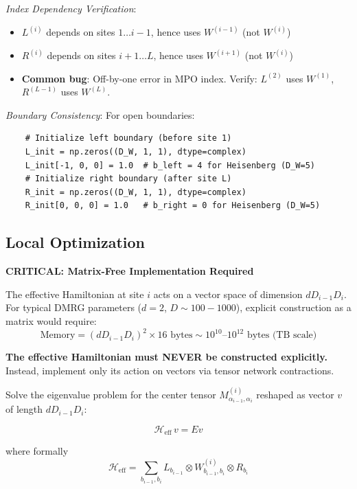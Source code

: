 \documentclass[aps,prb,onecolumn,scriptaddress]{revtex4-2}
\begin{document}
	\textit{Index Dependency Verification}:
	\begin{itemize}
		\item $L^{(i)}$ depends on sites $1 \dots i-1$, hence uses $W^{(i-1)}$ (not $W^{(i)}$)
		\item $R^{(i)}$ depends on sites $i+1 \dots L$, hence uses $W^{(i+1)}$ (not $W^{(i)}$)  
		\item \textbf{Common bug}: Off-by-one error in MPO index. Verify: $L^{(2)}$ uses $W^{(1)}$, $R^{(L-1)}$ uses $W^{(L)}$.
	\end{itemize}
	
	\textit{Boundary Consistency}: For open boundaries:
	\begin{verbatim}
	# Initialize left boundary (before site 1)
	L_init = np.zeros((D_W, 1, 1), dtype=complex)
	L_init[-1, 0, 0] = 1.0  # b_left = 4 for Heisenberg (D_W=5)
	# Initialize right boundary (after site L)
	R_init = np.zeros((D_W, 1, 1), dtype=complex)
	R_init[0, 0, 0] = 1.0   # b_right = 0 for Heisenberg (D_W=5)
	\end{verbatim}
	
	\subsection{Local Optimization}
	
	\textbf{CRITICAL: Matrix-Free Implementation Required}
	
	The effective Hamiltonian at site $i$ acts on a vector space of dimension $d D_{i-1} D_i$. For typical DMRG parameters ($d=2$, $D \sim 100-1000$), explicit construction as a matrix would require:
	\begin{equation}
		\text{Memory} = (d D_{i-1} D_i)^2 \times 16\text{ bytes} \sim 10^{10}\text{--}10^{12} \text{ bytes (TB scale)}
	\end{equation}
	
	\textbf{The effective Hamiltonian must NEVER be constructed explicitly.} Instead, implement only its action on vectors via tensor network contractions.
	
	Solve the eigenvalue problem for the center tensor $M^{(i)}_{\alpha_{i-1},\alpha_i}$ reshaped as vector $v$ of length $d D_{i-1} D_i$:
	
	\begin{equation}
		\mathcal{H}_{\text{eff}} \, v = E v
	\end{equation}
	
	where formally
	\begin{equation}
		\mathcal{H}_{\text{eff}} = \sum_{b_{i-1}, b_i} L_{b_{i-1}} \otimes W^{(i)}_{b_{i-1},b_i} \otimes R_{b_i}
	\end{equation}
	
\end{document}
